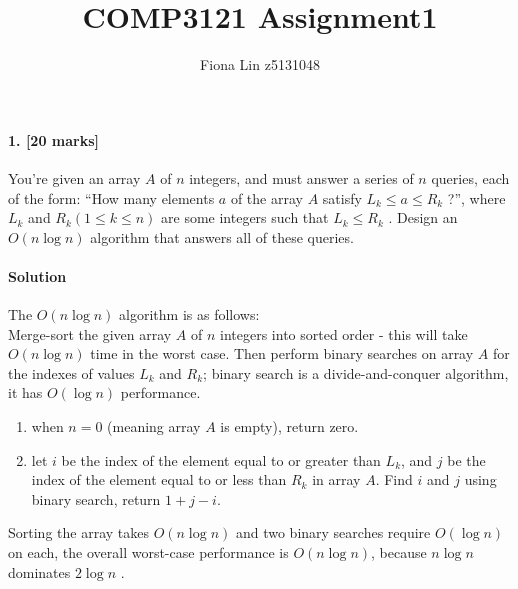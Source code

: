 \documentclass[a4paper]{scrartcl}
\title{COMP3121 Assignment1}
\author{Fiona Lin z5131048}
\begin{document}
\maketitle

\paragraph{1. [20 marks]}
\label{sec:Question 1}
You're given an array $A$ of $n$ integers, and must answer a series of $n$ queries, each of the form: “How many elements $a$ of the array $A$ satisfy $L_k \leq a \leq R_k$ ?”, where $L_k$ and $R_k (1 \leq k \leq n)$ are some integers such that $L_k \leq R_k$ . Design an $O(n\log{n})$ algorithm that answers all of these queries.
\paragraph{Solution}
The $O(n\log{n})$ algorithm is as follows:\\
Merge-sort the given array $A$ of $n$ integers into sorted order - this will take  $O(n\log{n})$ time in the worst case. Then perform binary searches on array $A$ for the indexes of values $L_k$ and $R_k$; binary search is a divide-and-conquer algorithm, it has $O(\log{n})$ performance.\\
\begin{enumerate}[label=(\alph*)]
  \item when $n=0$ (meaning array $A$ is empty), return zero.
  \item let $i$ be the index of the element equal to or greater than $L_k$, and $j$ be the index of the element equal to or less than $R_k$ in array $A$. Find $i$ and $j$ using binary search, return $1 + j - i$.
\end{enumerate}
Sorting the array takes $O(n\log{n})$ and two binary searches require $O(\log{n})$ on each, the overall worst-case performance is $O(n\log{n})$, because  $n\log{n}$ dominates $2\log{n}$ .
\end{document}
